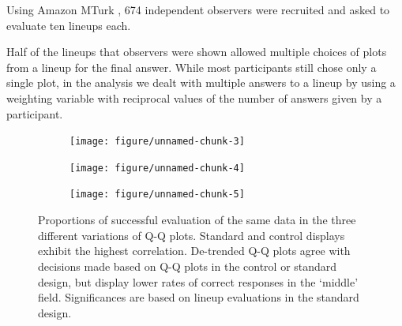 \documentclass{article}\usepackage[]{graphicx}\usepackage[]{color}
\newenvironment{knitrout}{}{} %
\begin{document}
Using  Amazon MTurk \citep{amazon}, 674 independent observers were recruited and asked to evaluate ten lineups each. 

Half of the lineups that observers were shown allowed multiple choices of plots from a lineup for the final answer. While most participants still chose only a single plot, in the analysis we dealt with multiple answers to a lineup by using a weighting variable with reciprocal values of the number of answers given by a participant.












\begin{figure}
\centering
\begin{subfigure}[b]{.3\textwidth}
\begin{knitrout}
\color{fgcolor}
\texttt{[image: figure/unnamed-chunk-3]} 

\end{knitrout}

\end{subfigure}
\begin{subfigure}[b]{.3\textwidth}
\begin{knitrout}
\color{fgcolor}
\texttt{[image: figure/unnamed-chunk-4]} 

\end{knitrout}

\end{subfigure}
\begin{subfigure}[b]{.3\textwidth}
\begin{knitrout}
\color{fgcolor}
\texttt{[image: figure/unnamed-chunk-5]} 

\end{knitrout}

\end{subfigure}
\caption{\label{fig:compare}Proportions of successful evaluation of the same data in the three different variations of Q-Q plots. Standard and control displays exhibit the highest correlation. De-trended Q-Q plots agree with decisions made based on Q-Q plots in the control or standard design, but display lower rates of correct responses in the `middle' field. Significances are based on lineup evaluations in the standard design. }
\end{figure}
\end{document}
